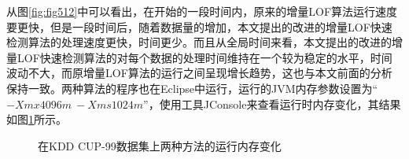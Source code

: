 从图\ref{fig:fig512}中可以看出，在开始的一段时间内，原来的增量LOF算法运行速度要更快，但是一段时间后，随着数据量的增加，本文提出的改进的增量LOF快速检测算法的处理速度更快，时间更少。而且从全局时间来看，本文提出的改进的增量LOF快速检测算法的对每个数据的处理时间维持在一个较为稳定的水平，时间波动不大，而原增量LOF算法的运行之间呈现增长趋势，这也与本文前面的分析保持一致。两种算法的程序也在Eclipse中运行，运行的JVM内存参数设置为“$-Xmx4096m\ -Xms1024m$”，使用工具JConsole来查看运行时内存变化，其结果如图\ref{fig:fig51015}所示。
\begin{figure}[htbp]
	\centering                                      %
	\caption{在KDD CUP-99数据集上两种方法的运行内存变化} %
	\label{fig:fig51015}                                       %
\end{figure}
